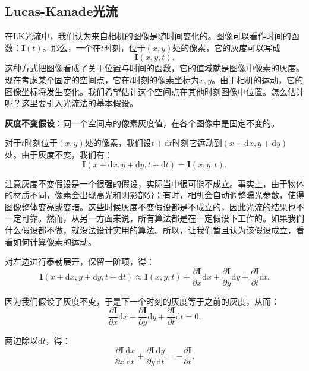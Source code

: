 \subsection*{Lucas-Kanade光流}
在LK光流中，我们认为来自相机的图像是随时间变化的。图像可以看作时间的函数：$\bm{I}(t)$。那么，一个在$t$时刻，位于$(x,y)$处的像素，它的灰度可以写成
\[
\bm{I}(x,y,t).
\]
这种方式把图像看成了关于位置与时间的函数，它的值域就是图像中像素的灰度。现在考虑某个固定的空间点，它在$t$时刻的像素坐标为$x,y$。由于相机的运动，它的图像坐标将发生变化。我们希望估计这个空间点在其他时刻图像中位置。怎么估计呢？这里要引入光流法的基本假设。

\textbf{灰度不变假设}：同一个空间点的像素灰度值，在各个图像中是固定不变的。

对于$t$时刻位于$(x,y)$处的像素，我们设$t+\mathrm{d}t$时刻它运动到$(x+\mathrm{d}x, y+\mathrm{d}y)$处。由于灰度不变，我们有：
\begin{equation} 
\bm{I}(x+\mathrm{d}x, y+\mathrm{d}y, t+\mathrm{d}t) = \bm{I} (x,y,t).
\end{equation}

注意灰度不变假设是一个很强的假设，实际当中很可能不成立。事实上，由于物体的材质不同，像素会出现高光和阴影部分；有时，相机会自动调整曝光参数，使得图像整体变亮或变暗。这些时候灰度不变假设都是不成立的，因此光流的结果也不一定可靠。然而，从另一方面来说，所有算法都是在一定假设下工作的。如果我们什么假设都不做，就没法设计实用的算法。所以，让我们暂且认为该假设成立，看看如何计算像素的运动。

对左边进行泰勒展开，保留一阶项，得：
\begin{equation}
\bm{I} \left( {x + \mathrm{d}x,y + \mathrm{d}y,t + \mathrm{d}t} \right) \approx \bm{I} \left( {x,y,t} \right) + \frac{{\partial \bm{I} }}{{\partial x}}\mathrm{d}x + \frac{{\partial \bm{I}}}{{\partial y}}\mathrm{d}y + \frac{{\partial \bm{I}}}{{\partial t}}\mathrm{d}t.
\end{equation}

因为我们假设了灰度不变，于是下一个时刻的灰度等于之前的灰度，从而：
\begin{equation}
 \frac{{\partial \bm{I} }}{{\partial x}}\mathrm{d}x + \frac{{\partial \bm{I}}}{{\partial y}}\mathrm{d}y + \frac{{\partial \bm{I}}}{{\partial t}}\mathrm{d}t = 0.
\end{equation}

两边除以$\mathrm{d}t$，得：
\begin{equation}\label{key}
 \frac{{\partial \bm{I} }}{{\partial x}} \frac{\mathrm{d}x}{\mathrm{d}t} + \frac{{\partial \bm{I}}}{{\partial y}} \frac{\mathrm{d}y}{\mathrm{d}t} =- \frac{{\partial \bm{I}}}{{\partial t}}.
\end{equation}


